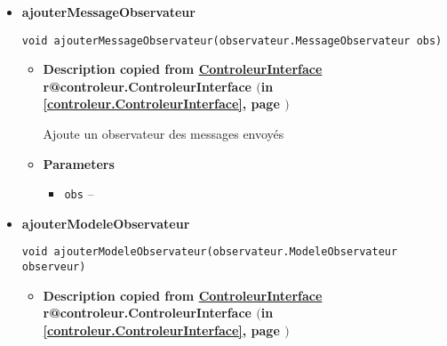 \documentclass[11pt,a4paper]{report}
\makeatletter
\newcommand{\refdefined}[1]{
\expandafter\ifx\csname r@#1\endcsname\relax
\relax\else
{$($in \ref{#1}, page \pageref{#1}$)$}\fi}
\makeatother
\begin{document}
{{{{{\begin{itemize}
{\begin{itemize}
{Ajoute un observateur à l'annulation d'une commande
}
\item{
{\bf  Parameters}
  \begin{itemize}
   \item{
\texttt{annulerCommandeObserveur} -- }
  \end{itemize}
}%
\end{itemize}
}%
\item{ 
\hypertarget{controleur.Controleur.ajouterMessageObservateur(controleur.observateur.MessageObservateur)}{{\bf  ajouterMessageObservateur}\\}
\begin{lstlisting}[frame=none]
void ajouterMessageObservateur(observateur.MessageObservateur obs)\end{lstlisting} %
\begin{itemize}
\item{
{\bf  Description copied from \hyperlink{controleur.ControleurInterface}{ControleurInterface}{\small \refdefined{controleur.ControleurInterface}} }

Ajoute un observateur des messages envoyés
}
\item{
{\bf  Parameters}
  \begin{itemize}
   \item{
\texttt{obs} -- }
  \end{itemize}
}%
\end{itemize}
}%
\item{ 
\hypertarget{controleur.Controleur.ajouterModeleObservateur(controleur.observateur.ModeleObservateur)}{{\bf  ajouterModeleObservateur}\\}
\begin{lstlisting}[frame=none]
void ajouterModeleObservateur(observateur.ModeleObservateur observeur)\end{lstlisting} %
\begin{itemize}
\item{
{\bf  Description copied from \hyperlink{controleur.ControleurInterface}{ControleurInterface}{\small \refdefined{controleur.ControleurInterface}} }

}
\end{itemize}}
\end{itemize}}}}}}
\end{document}
